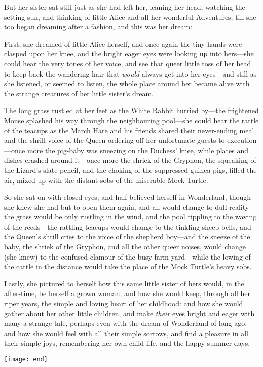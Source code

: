 But her sister sat still just as she had left her, leaning her head, watching the setting sun, and thinking of little Alice and all her wonderful Adventures, till she too began dreaming after a fashion, and this was her dream:

First, she dreamed of little Alice herself, and once again the tiny hands were clasped upon her knee, and the bright eager eyes were looking up into hers—she could hear the very tones of her voice, and see that queer little toss of her head to keep back the wandering hair that \textit{would} always get into her eyes—and still as she listened, or seemed to listen, the whole place around her became alive with the strange creatures of her little sister's dream.

The long grass rustled at her feet as the White Rabbit hurried by—the frightened Mouse splashed his way through the neighbouring pool—she could hear the rattle of the teacups as the March Hare and his friends shared their never-ending meal, and the shrill voice of the Queen ordering off her unfortunate guests to execution—once more the pig-baby was sneezing on the Duchess' knee, while plates and dishes crashed around it—once more the shriek of the Gryphon, the squeaking of the Lizard's slate-pencil, and the choking of the suppressed guinea-pigs, filled the air, mixed up with the distant sobs of the miserable Mock Turtle.

So she sat on with closed eyes, and half believed herself in Wonderland, though she knew she had but to open them again, and all would change to dull reality—the grass would be only rustling in the wind, and the pool rippling to the waving of the reeds—the rattling teacups would change to the tinkling sheep-bells, and the Queen's shrill cries to the voice of the shepherd boy—and the sneeze of the baby, the shriek of the Gryphon, and all the other queer noises, would change (she knew) to the confused clamour of the busy farm-yard—while the lowing of the cattle in the distance would take the place of the Mock Turtle's heavy sobs.

Lastly, she pictured to herself how this same little sister of hers would, in the after-time, be herself a grown woman; and how she would keep, through all her riper years, the simple and loving heart of her childhood: and how she would gather about her other little children, and make \textit{their} eyes bright and eager with many a strange tale, perhaps even with the dream of Wonderland of long ago: and how she would feel with all their simple sorrows, and find a pleasure in all their simple joys, remembering her own child-life, and the happy summer days.

\vfill
\centerline{\texttt{[image: end]}}
\vfill
